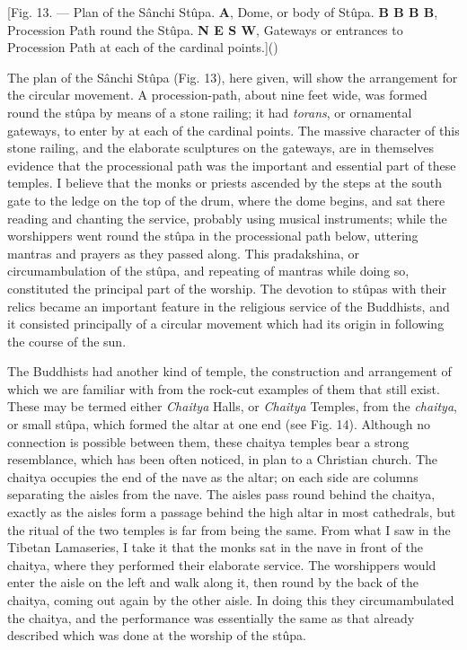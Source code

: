 \documentclass[a4paper, 11pt, oneside, polutonikogreek, english]{article}
\begin{document}
[Fig. 13. --- Plan of the Sânchi Stûpa. \textbf{A}, Dome, or body of Stûpa. \textbf{B B B B}, Procession Path round the Stûpa. \textbf{N E S W}, Gateways or entrances to Procession Path at each of the cardinal points.]()

The plan of the Sânchi Stûpa (Fig. 13), here given, will show the arrangement for the circular movement. A procession-path, about nine feet wide, was formed round the stûpa by means of a stone railing; it had \emph{torans}, or ornamental gateways, to enter by at each of the cardinal points. The massive character of this stone railing, and the elaborate sculptures on the gateways, are in themselves evidence that the processional path was the important and essential part of these temples. I believe that the monks or priests ascended by the steps at the south gate to the ledge on the top of the drum, where the dome begins, and sat there reading and chanting the service, probably using musical instruments; while the worshippers went round the stûpa in the processional path below, uttering mantras and prayers as they passed along. This pradakshina, or circumambulation of the stûpa, and repeating of mantras while doing so, constituted the principal part of the worship. The devotion to stûpas with their relics became an important feature in the religious service of the Buddhists, and it consisted principally of a circular movement which had its origin in following the course of the sun.

The Buddhists had another kind of temple, the construction and arrangement of which we are familiar with from the rock-cut examples of them that still exist. These may be termed either \emph{Chaitya} Halls, or \emph{Chaitya} Temples, from the \emph{chaitya}, or small stûpa, which formed the altar at one end (see Fig. 14). Although no connection is possible between them, these chaitya temples bear a strong resemblance, which has been often noticed, in plan to a Christian church. The chaitya occupies the end of the nave as the altar; on each side are columns separating the aisles from the nave. The aisles pass round behind the chaitya, exactly as the aisles form a passage behind the high altar in most cathedrals, but the ritual of the two temples is far from being the same. From what I saw in the Tibetan Lamaseries, I take it that the monks sat in the nave in front of the chaitya, where they performed their elaborate service. The worshippers would enter the aisle on the left and walk along it, then round by the back of the chaitya, coming out again by the other aisle. In doing this they circumambulated the chaitya, and the performance was essentially the same as that already described which was done at the worship of the stûpa.
\end{document}
